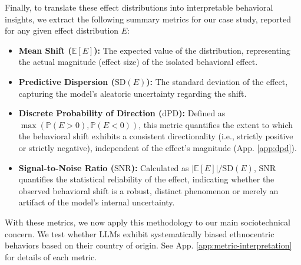 Finally, to translate these effect distributions into interpretable behavioral insights, we extract the following summary metrics for our case study, reported for any given effect distribution $E$:
\begin{itemize}
    \item \textbf{Mean Shift ($\mathbb{E}[E]$):} The expected value of the distribution, representing the actual magnitude (effect size) of the isolated behavioral effect.
    \item \textbf{Predictive Dispersion ($\mathrm{SD}(E)$):} The standard deviation of the effect, capturing the model's aleatoric uncertainty regarding the shift.
    \item \textbf{Discrete Probability of Direction ($\mathrm{dPD}$):} Defined as $\max(\mathbb{P}(E > 0), \mathbb{P}(E < 0))$, this metric quantifies the extent to which the behavioral shift exhibits a consistent directionality (i.e., strictly positive or strictly negative), independent of the effect's magnitude (App. \ref{app:dpd}).
    \item \textbf{Signal-to-Noise Ratio ($\mathrm{SNR}$):} Calculated as $|\mathbb{E}[E]|/\mathrm{SD}(E)$, SNR quantifies the statistical reliability of the effect, indicating whether the observed behavioral shift is a robust, distinct phenomenon or merely an artifact of the model's internal uncertainty.
\end{itemize}
With these metrics, we now apply this methodology to our main sociotechnical concern. 
We test whether LLMs exhibit systematically biased ethnocentric behaviors based on their country of origin.
See App. \ref{app:metric-interpretation} for details of each metric.

